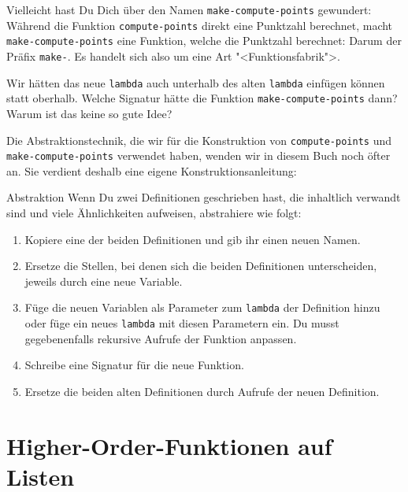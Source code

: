 Vielleicht hast Du Dich über den Namen \lstinline{make-compute-points}
gewundert: Während die Funktion \lstinline{compute-points} direkt eine Punktzahl
berechnet, macht \lstinline{make-compute-points} eine Funktion, welche
die Punktzahl berechnet: Darum der Präfix \lstinline{make-}.  Es
handelt sich also um eine Art "<Funktionsfabrik">.

\begin{aufgabeinline}
  Wir hätten das neue \lstinline{lambda} auch unterhalb des alten
  \lstinline{lambda} einfügen können statt oberhalb.  Welche Signatur
  hätte die Funktion \lstinline{make-compute-points} dann?  Warum ist
  das keine so gute Idee?
\end{aufgabeinline}

Die Abstraktionstechnik, die wir für die Konstruktion von
\lstinline{compute-points} und \lstinline{make-compute-points}
verwendet haben, wenden wir in diesem Buch noch öfter an.  Sie
verdient deshalb eine eigene Konstruktionsanleitung:

\begin{konstruktionsanleitung}{Abstraktion}
  \label{ka:abstraktion}
  Wenn Du zwei Definitionen geschrieben hast, die inhaltlich verwandt
  sind und viele Ähnlichkeiten aufweisen, abstrahiere wie folgt:
  \begin{enumerate}
  \item Kopiere eine der beiden Definitionen und gib ihr einen neuen
    Namen.
  \item Ersetze die Stellen, bei denen sich die beiden Definitionen
    unterscheiden, jeweils durch eine neue Variable.
  \item Füge die neuen Variablen als Parameter zum \lstinline{lambda}
    der Definition hinzu oder füge ein neues \lstinline{lambda} mit
    diesen Parametern ein.  Du musst gegebenenfalls rekursive Aufrufe
    der Funktion anpassen.
  \item Schreibe eine Signatur für die neue Funktion.
  \item Ersetze die beiden alten Definitionen durch Aufrufe der neuen
    Definition.
  \end{enumerate}
\end{konstruktionsanleitung}

\section{Higher-Order-Funktionen auf Listen}

